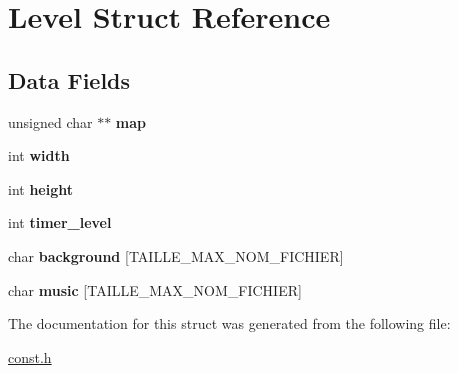 \hypertarget{struct_level}{\section{Level Struct Reference}
\label{struct_level}
}
\subsection*{Data Fields}
\begin{DoxyCompactItemize}
\item 
\hypertarget{struct_level_a6d985f8729c187f1c35dabba2738f0bd}{unsigned char $\ast$$\ast$ {\bfseries map}}\label{struct_level_a6d985f8729c187f1c35dabba2738f0bd}

\item 
\hypertarget{struct_level_a2474a5474cbff19523a51eb1de01cda4}{int {\bfseries width}}\label{struct_level_a2474a5474cbff19523a51eb1de01cda4}

\item 
\hypertarget{struct_level_ad12fc34ce789bce6c8a05d8a17138534}{int {\bfseries height}}\label{struct_level_ad12fc34ce789bce6c8a05d8a17138534}

\item 
\hypertarget{struct_level_a28c59da9677a9d7b98db49328a77dc3c}{int {\bfseries timer\-\_\-level}}\label{struct_level_a28c59da9677a9d7b98db49328a77dc3c}

\item 
\hypertarget{struct_level_a9105c37f5522780c25319a1f3e2b567e}{char {\bfseries background} \mbox{[}T\-A\-I\-L\-L\-E\-\_\-\-M\-A\-X\-\_\-\-N\-O\-M\-\_\-\-F\-I\-C\-H\-I\-E\-R\mbox{]}}\label{struct_level_a9105c37f5522780c25319a1f3e2b567e}

\item 
\hypertarget{struct_level_a336b36e6e5671382e6d8dc67dcec915b}{char {\bfseries music} \mbox{[}T\-A\-I\-L\-L\-E\-\_\-\-M\-A\-X\-\_\-\-N\-O\-M\-\_\-\-F\-I\-C\-H\-I\-E\-R\mbox{]}}\label{struct_level_a336b36e6e5671382e6d8dc67dcec915b}

\end{DoxyCompactItemize}


The documentation for this struct was generated from the following file\-:\begin{DoxyCompactItemize}
\item 
\hyperlink{const_8h}{const.\-h}\end{DoxyCompactItemize}
